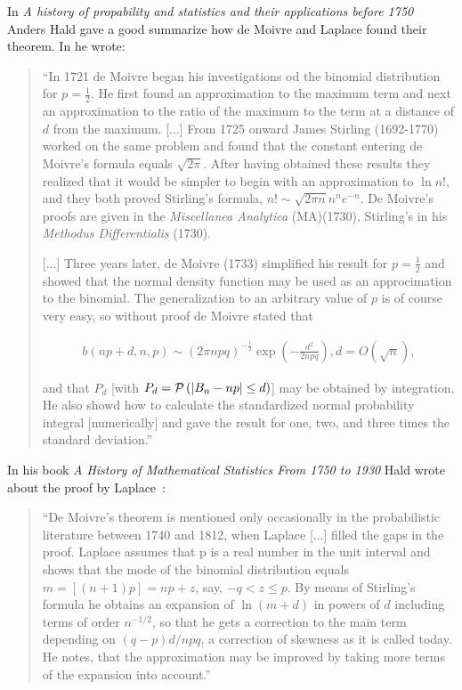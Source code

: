 In \emph{A history of propability and statistics and their applications before 1750} Anders Hald gave a good summarize how de Moivre and Laplace found their theorem. In \cite[pp. 469-470]{hald1} he wrote:

\begin{quotation}
  ``In 1721 de Moivre began his investigations od the binomial distribution for $p=\tfrac 12$. He first found an approximation to the maximum term and next an approximation to the ratio of the maximum to the term at a distance of $d$ from the maximum. [...] From 1725 onward James Stirling (1692-1770) worked on the same problem and found that the constant entering de Moivre's formula equals $\sqrt{2\pi}$. After having obtained these results they realized that it would be simpler to begin with an approximation to $\ln n!$, and they both proved Stirling's formula, $n! \sim \sqrt{2\pi n}n^ne^{-n}$. De Moivre's proofs are given in the \emph{Miscellanea Analytica} (MA)(1730), Stirling's in his \emph{Methodus Differentialis} (1730).

  [...] Three years later, de Moivre (1733) simplified his result for $p=\tfrac 12$ and showed that the normal density function may be used as an approcimation to the binomial. The generalization to an arbitrary value of $p$ is of course very easy, so without proof de Moivre stated that

  \begin{align*}
      b(np+d,n,p) \sim (2\pi npq)^{-\tfrac 12} \exp\left( -\frac{d^2}{2npq} \right), d = O(\sqrt n),
  \end{align*}

  and that $P_d$ [with $P_d=\mathcal P\left({|B_{n} -np|\le d}\right)$] may be obtained by integration. He also showd how to calculate the standardized normal probability integral [numerically] and gave the result for one, two, and three times the standard deviation.''
\end{quotation}

In his book \emph{A History of Mathematical Statistics From 1750 to 1930} Hald wrote about the proof by Laplace~\cite[p. 24]{hald2}:

\begin{quote}
  ``De Moivre's theorem is mentioned only occasionally in the probabilistic literature between 1740 and 1812, when Laplace [...] filled the gaps in the proof. Laplace assumes that p is a real number in the unit interval  and shows that the mode of the binomial distribution equals $m=[(n+1)p]=np+z$, say, $-q < z \le p$. By means of Stirling's formula he obtains an expansion of $\ln(m+d)$ in powers of $d$ including terms of order $n^{-1/2}$, so that he gets a correction to the main term depending on $(q-p)d/npq$, a correction of skewness as it is called today. He notes, that the approximation may be improved by taking more terms of the expansion into account.''
\end{quote}

